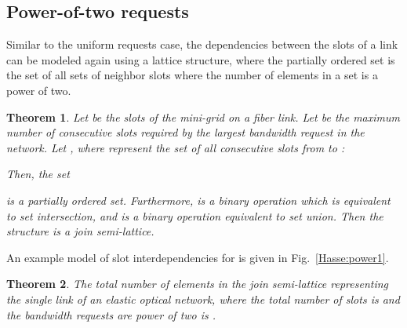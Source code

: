 \documentclass[letterpaper,10pt]{article}\pdfoutput=1
\newtheorem{theorem}{Theorem}
\begin{document}
\subsection{Power-of-two requests}
Similar to the uniform requests case, the dependencies between the slots of a link can be modeled again using a 
lattice structure, where the partially ordered set is the set of all sets of neighbor slots where the number
of elements in a set is a power of two.
\begin{theorem}
Let  be the slots of the mini-grid on a fiber link. 
Let  be the maximum number of consecutive slots required by the largest bandwidth request in the network.
Let , where  represent the set of all consecutive slots from  to : 

Then, the set

is a partially ordered set. Furthermore,  is a binary operation which is equivalent to set intersection, 
and  is a binary operation equivalent to set union. Then the structure  is a join semi-lattice.
\end{theorem}
An example model of slot interdependencies for  is given in Fig.~\ref{Hasse:power1}.
\begin{theorem}The total number of elements in the join semi-lattice  representing the single link of an
elastic optical network, where the total number of slots is  and the bandwidth requests are power of two is
.
\end{theorem}
\end{document}
